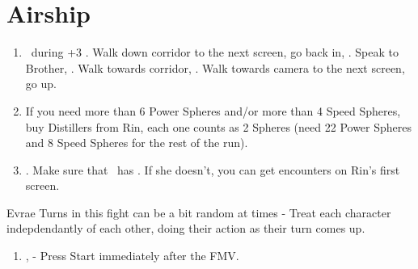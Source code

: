 \chapter{Airship}

\begin{enumerate}
	\item \sd\ during \cs+3 \skippablefmv. Walk down corridor to the next screen, go back in, \sd. Speak to Brother, \sd. Walk towards corridor, \sd. Walk towards camera to the next screen, go up.
	\item If you need more than 6 Power Spheres and/or more than 4 Speed Spheres, buy Distillers from Rin, each one counts as 2 Spheres (need 22 Power Spheres and 8 Speed Spheres for the rest of the run).
	\item \save. Make sure that \rikku\ has \od. If she doesn't, you can get encounters on Rin's first screen.
\end{enumerate}
\begin{battle}[32000]{Evrae}
	Turns in this fight can be a bit random at times - Treat each character indepdendantly of each other, doing their action as their turn comes up.
	\begin{itemize}
	\end{itemize}
\end{battle}
\begin{enumerate}[resume]
	\item \sd, \skippablefmv[3:00] - Press Start immediately after the FMV.
\end{enumerate}
